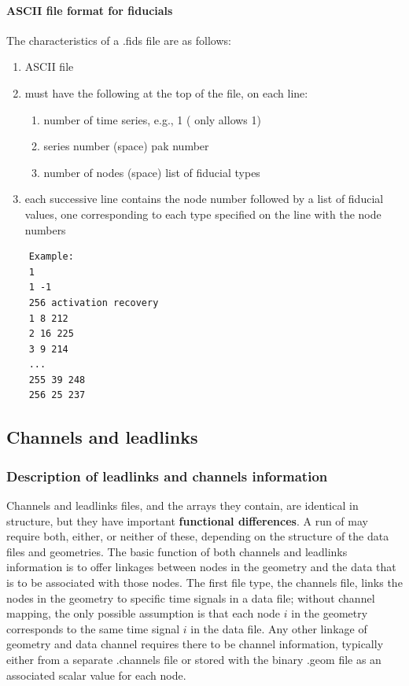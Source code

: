\paragraph{ASCII file format for fiducials}

The characteristics of a .fids file are as follows:
\begin{enumerate}
  \item ASCII file
  \item must have the following at the top of the file, on each line:
  \begin{enumerate}
    \item number of time series, e.g., 1 (\map{} only allows 1)
    \item series number (space) pak number
    \item number of nodes (space) list of fiducial types
  \end{enumerate}
  \item each successive line contains the node number followed by
        a list of fiducial values, one corresponding to each
        type specified on the line with the node numbers
\end{enumerate}

\begin{verbatim}
    Example:
    1
    1 -1
    256 activation recovery
    1 8 212
    2 16 225
    3 9 214
    ...
    255 39 248
    256 25 237  
\end{verbatim}



\subsection{Channels and leadlinks}
\label{sec:leadfiles} 

\subsubsection{Description of leadlinks and channels
information}

Channels and leadlinks files, and the arrays they
contain, are identical in structure, but they have important {\bf
functional differences}.  A run of \map{} may require both, either, or
neither of these, depending on the structure of the data files and
geometries. The basic function of both channels and leadlinks information
is to offer linkages between nodes in the geometry and the data that is to
be associated with those nodes.  The first file type, the channels file,
links the nodes in the geometry to specific time signals in a data file;
without channel mapping, the only possible assumption is that each node $i$
in the geometry corresponds to the same time signal $i$ in the data file.
Any other linkage of geometry and data channel requires there to be channel
information, typically either from a separate .channels file or stored with
the binary .geom file as an associated scalar value for each node.

